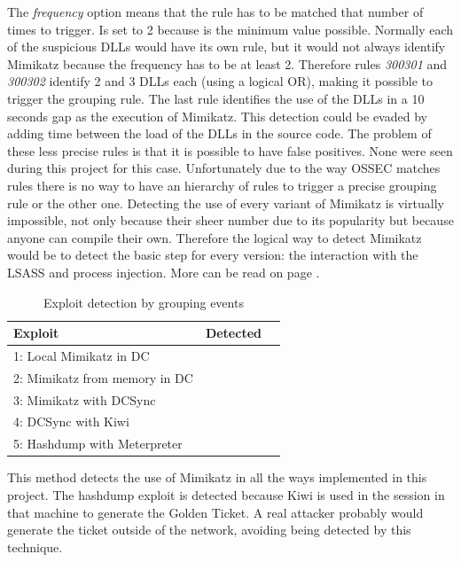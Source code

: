 \linej
The \textit{frequency} option means that the rule has to be matched that number of times to trigger. Is set to 2 because is the minimum value possible.
\linej
\linej
Normally each of the suspicious DLLs would have its own rule, but it would not always identify Mimikatz because the frequency has to be at least 2. Therefore rules \textit{300301} and \textit{300302} identify 2 and 3 DLLs each (using a logical OR), making it possible to trigger the grouping rule.
The last rule identifies the use of the DLLs in a 10 seconds gap as the execution of Mimikatz. This detection could be evaded by adding time between the load of the DLLs in the source code.
\linej
\linej
The problem of these less precise rules is that it is possible to have false positives. None were seen during this project for this case.
\linej
Unfortunately due to the way OSSEC matches rules there is no way to have an hierarchy of rules to trigger a precise grouping rule or the other one.
\linej
\linej
Detecting the use of every variant of Mimikatz is virtually impossible, not only because their sheer number due to its popularity but because anyone can compile their own. Therefore the logical way to detect Mimikatz would be to detect the basic step for every version: the interaction with the LSASS and process injection. More can be read on page \pageref{detect_lsass}.

\begin{table}[H]
	\centering
	\begin{tabular}{|l|l|l|}
		\hline
		\rowcolor{gray!30}
		Exploit & Detected \\ \hline
		1: Local Mimikatz in DC& \RYES\\ \hline
		2: Mimikatz from memory in DC& \RYES\\ \hline
		3: Mimikatz with DCSync& \RYES\\ \hline
		4: DCSync with Kiwi& \RYES\\ \hline
		5: Hashdump with Meterpreter& \RYES\\ \hline
	\end{tabular}
	\caption{Exploit detection by grouping events}
\end{table}
This method detects the use of Mimikatz in all the ways implemented in this project.
The hashdump exploit is detected because Kiwi is used in the session in that machine to generate the Golden Ticket. A real attacker probably would generate the ticket outside of the network, avoiding being detected by this technique.


